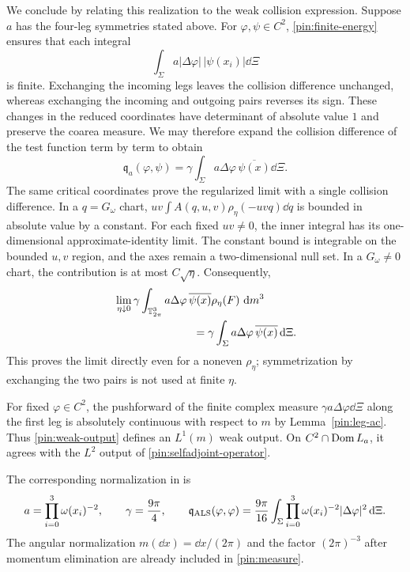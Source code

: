 We conclude by relating this realization to the weak collision
expression. Suppose $a$ has the four-leg symmetries stated above.
For $\varphi,\psi\in C^2$, \eqref{pin:finite-energy} ensures that
each integral
\[
                    \int_\Sigma a|\Delta\varphi|\,|\psi(x_i)|\dd\Xi
\]
is finite. Exchanging the incoming legs leaves the collision difference
unchanged, whereas exchanging the incoming and outgoing pairs reverses
its sign. These changes in the reduced coordinates have determinant
of absolute value $1$ and preserve the coarea measure. We may therefore
expand the collision difference of the test function term by term to
obtain
\begin{equation}
       \mathfrak q_a(\varphi,\psi)
        =\gamma\int_\Sigma
                    a\Delta\varphi\,\overline{\psi(x)}\dd\Xi.
 \label{pin:weak-output}
\end{equation}
The same critical coordinates prove the regularized limit with a
single collision difference. In a $q=G_\omega$ chart,
$uv\int A(q,u,v)\rho_\eta(-uvq)\dd q$ is bounded in absolute value
by a constant. For each fixed $uv\ne0$, the inner integral has its
one-dimensional approximate-identity limit. The constant bound is
integrable on the bounded $u,v$ region, and the axes remain a
two-dimensional null set. In a $G_\omega\ne0$ chart, the contribution
is at most $C\sqrt\eta$. Consequently,
\begin{equation}
 \begin{split}
 &\lim_{\eta\downarrow0}\gamma
 \int_{\mathbb T_{2\pi}^3}
       a\Delta\varphi\,\overline{\psi(x)}\rho_\eta(F)\,\dd m^3\\
 &\hspace{25mm}=\gamma\int_\Sigma
                    a\Delta\varphi\,\overline{\psi(x)}\dd\Xi.
 \end{split}
 \label{pin:weak-mollifier}
\end{equation}
This proves the limit directly even for a noneven $\rho_\eta$;
symmetrization by exchanging the two pairs is not used at finite
$\eta$.

For fixed $\varphi\in C^2$, the pushforward of the finite complex
measure $\gamma a\Delta\varphi\dd\Xi$ along the first leg is
absolutely continuous with respect to $m$ by Lemma~\ref{pin:leg-ac}.
Thus \eqref{pin:weak-output} defines an $L^1(m)$ weak output. On
$C^2\cap\operatorname{Dom} L_a$, it agrees with the $L^2$ output of
\eqref{pin:selfadjoint-operator}.

The corresponding normalization in
\cite[equations (3.21) and (4.1)]{ALS2006} is
\begin{equation}
             a=\prod_{i=0}^3\omega(x_i)^{-2},\qquad
             \gamma=\frac{9\pi}{4},\qquad
 \mathfrak q_{\rm ALS}(\varphi,\varphi)
     =\frac{9\pi}{16}\int_\Sigma
             \prod_{i=0}^3\omega(x_i)^{-2}|\Delta\varphi|^2\,\mathrm d\Xi.
 \label{pin:als-normalization}
\end{equation}
The angular normalization $m(\dd x)=\dd x/(2\pi)$ and the factor
$(2\pi)^{-3}$ after momentum elimination are already included in
\eqref{pin:measure}.

